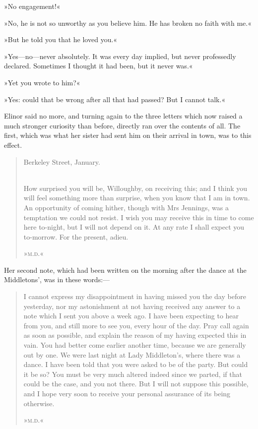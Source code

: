 »No engagement!«

»No, he is not so unworthy as you believe him. He has broken no faith with me.«

»But he told you that he loved you.«

»Yes—no—never absolutely. It was every day implied, but never professedly declared. Sometimes I thought it had been, but it never was.«

»Yet you wrote to him?«

»Yes: could that be wrong after all that had passed? But I cannot talk.«

Elinor said no more, and turning again to the three letters which now raised a much stronger curiosity than before, directly ran over the contents of all. The first, which was what her sister had sent him on their arrival in town, was to this effect.

\begin{quotation}
\begin{flushright}
Berkeley Street, January.
\end{flushright}
~\\
\indent How surprised you will be, Willoughby, on receiving this; and I think you will feel something more than surprise, when you know that I am in town. An opportunity of coming hither, though with Mrs Jennings, was a temptation we could not resist. I wish you may receive this in time to come here to-night, but I will not depend on it. At any rate I shall expect you to-morrow. For the present, adieu.

\begin{flushright}
»\textsc{m.d.}«
\end{flushright}
\end{quotation}

Her second note, which had been written on the morning after the dance at the Middletons’, was in these words:—

\begin{quotation}
\indent I cannot express my disappointment in having missed you the day before yesterday, nor my astonishment at not having received any answer to a note which I sent you above a week ago. I have been expecting to hear from you, and still more to see you, every hour of the day. Pray call again as soon as possible, and explain the reason of my having expected this in vain. You had better come earlier another time, because we are generally out by one. We were last night at Lady Middleton’s, where there was a dance. I have been told that you were asked to be of the party. But could it be so? You must be very much altered indeed since we parted, if that could be the case, and you not there. But I will not suppose this possible, and I hope very soon to receive your personal assurance of its being otherwise.

\begin{flushright}
»\textsc{m.d.}«
\end{flushright}
\end{quotation}


